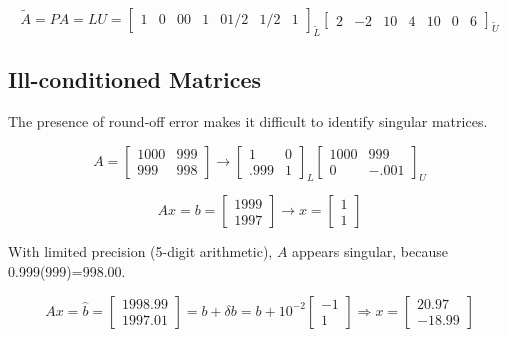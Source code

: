 \documentclass[12pt]{article}
\newcommand{\<}{\langle}
\renewcommand{\>}{\rangle}
\begin{document}
\[
	\tilde{A} = PA = LU = 
	\begin{bmatrix}
		1 & 0 & 0
		0 & 1 & 0
		1/2 & 1/2 & 1
	\end{bmatrix}_{\tilde{L}}
	\begin{bmatrix}
		2 & -2 & 1
		0 & 4 & 1
		0 & 0 & 6
	\end{bmatrix}_{\tilde{U}}
\]


\subsection{Ill-conditioned Matrices}

The presence of round-off error makes it difficult to identify singular matrices.

\[
	A =
	\begin{bmatrix}
		1000 & 999 \\ 999 & 998		
	\end{bmatrix}	
	\rightarrow
	\begin{bmatrix}
		1 & 0 \\ .999 & 1
	\end{bmatrix}_L
	\begin{bmatrix}
		1000 & 999 \\
		0 & -.001
	\end{bmatrix}_U
\]


\[
	Ax = b = \begin{bmatrix} 1999 \\ 1997 \end{bmatrix}
	\rightarrow
	x = \begin{bmatrix} 1 \\ 1 \end{bmatrix}
\]

With limited precision (5-digit arithmetic), $A$ appears singular, because 0.999(999)=998.00.

\[
	Ax = \hat{b} = \begin{bmatrix} 1998.99 \\ 1997.01 \end{bmatrix} =
	b + \delta b = b + 10^{-2} \begin{bmatrix} -1 \\ 1 \end{bmatrix}
	\Rightarrow
	x = \begin{bmatrix} 20.97 \\ -18.99 \end{bmatrix}
\]
\end{document}
